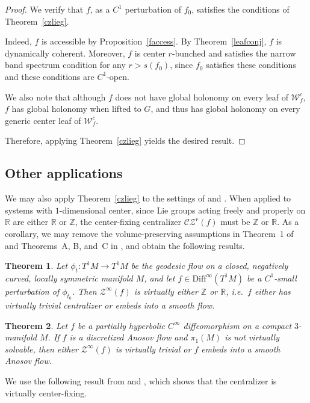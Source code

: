 \documentclass[11pt]{amsart}
\numberwithin{equation}{section}
\newcommand{\R}{\mathbb{R}}
\newcommand{\Z}{\mathbb{Z}}
\newcommand{\W}{\mathcal{W}}
\newcommand{\CZ}{\mathcal{CZ}}
\theoremstyle{plain}
\newtheorem{thm}{Theorem}[section]
\begin{document}
\begin{proof}
We verify that $f$, as a $C^1$ perturbation of $f_0$, satisfies the conditions of Theorem~\ref{czlieg}.

Indeed, $f$ is accessible by Proposition~\ref{faccess}. By Theorem~\ref{leafconj}, $f$ is dynamically coherent. Moreover, $f$ is center $r$-bunched and satisfies the narrow band spectrum condition for any $r>s(f_0)$, since $f_0$ satisfies these conditions and these conditions are $C^1$-open.

We also note that although $f$ does not have global holonomy on every leaf of $\W^c_f$, $f$ has global holonomy when lifted to $G$, and thus has global holonomy on every generic center leaf of $\W^c_f$.

Therefore, applying Theorem~\ref{czlieg} yields the desired result.
\end{proof}

\subsection{Other applications}

We may also apply Theorem~\ref{czlieg} to the settings of \cite{DWX} and \cite{BG}. When applied to systems with $1$-dimensional center, since Lie groups acting freely and properly on $\R$ are either $\R$ or $\Z$, the center-fixing centralizer $\CZ^r(f)$ must be $\Z$ or $\R$. As a corollary, we may remove the volume-preserving assumptions in Theorem~1 of \cite{DWX} and Theorems~A, B, and~C in \cite{BG}, and obtain the following results.

\begin{thm}\label{1dcen1}
Let $\phi_t:T^1M\to T^1M$ be the geodesic flow on a closed, negatively curved, locally symmetric manifold $M$, and let $f\in \mathrm{Diff}^\infty(T^1M)$ be a $C^1$-small perturbation of $\phi_{t_0}$. Then $\mathcal{Z}^\infty(f)$ is virtually either $\Z$ or $\R$, i.e.\ $f$ either has virtually trivial centralizer or embeds into a smooth flow.
\end{thm}

\begin{thm}\label{1dcen2}
Let $f$ be a partially hyperbolic $C^\infty$ diffeomorphism on a compact $3$-manifold $M$. If $f$ is a discretized Anosov flow and $\pi_1(M)$ is not virtually solvable, then either $\mathcal{Z}^\infty(f)$ is virtually trivial or $f$ embeds into a smooth Anosov flow.
\end{thm}

We use the following result from \cite{DWX} and \cite{BG}, which shows that the centralizer is virtually center-fixing.
\end{document}
